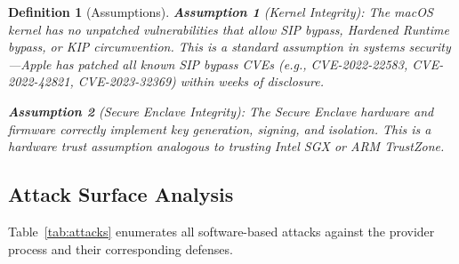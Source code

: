 \documentclass[10pt,twocolumn,letterpaper]{article}
\newtheorem{definition}{Definition}
\begin{document}
\begin{definition}[Assumptions]
\label{asm:kernel}
\textbf{Assumption 1} (Kernel Integrity): The macOS kernel has no unpatched vulnerabilities that allow SIP bypass, Hardened Runtime bypass, or KIP circumvention. This is a standard assumption in systems security---Apple has patched all known SIP bypass CVEs (e.g., CVE-2022-22583, CVE-2022-42821, CVE-2023-32369) within weeks of disclosure.

\textbf{Assumption 2} (Secure Enclave Integrity): The Secure Enclave hardware and firmware correctly implement key generation, signing, and isolation. This is a hardware trust assumption analogous to trusting Intel SGX or ARM TrustZone.
\end{definition}

\subsection{Attack Surface Analysis}

Table~\ref{tab:attacks} enumerates all software-based attacks against the provider process and their corresponding defenses.
\end{document}
